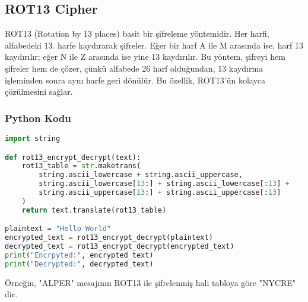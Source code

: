 \subsection{ROT13 Cipher}

ROT13 (Rotation by 13 places) basit bir şifreleme yöntemidir. Her harfi, alfabedeki 13. harfe kaydırarak şifreler. Eğer bir harf A ile M arasında ise, harf 13 kaydırılır; eğer N ile Z arasında ise yine 13 kaydırılır. Bu yöntem, şifreyi hem şifreler hem de çözer, çünkü alfabede 26 harf olduğundan, 13 kaydırma işleminden sonra aynı harfe geri dönülür. Bu özellik, ROT13'ün kolayca çözülmesini sağlar.

\subsubsection{Python Kodu}

\begin{lstlisting}[language=Python]
import string

def rot13_encrypt_decrypt(text):
    rot13_table = str.maketrans(
        string.ascii_lowercase + string.ascii_uppercase,
        string.ascii_lowercase[13:] + string.ascii_lowercase[:13] +
        string.ascii_uppercase[13:] + string.ascii_uppercase[:13]
    )
    return text.translate(rot13_table)

plaintext = "Hello World"
encrypted_text = rot13_encrypt_decrypt(plaintext)
decrypted_text = rot13_encrypt_decrypt(encrypted_text)
print("Encrpyted:", encrypted_text)
print("Decrypted:", decrypted_text)
\end{lstlisting}

\begin{table}[ht]
\centering
{}
\end{table}

Örneğin, "ALPER" mesajının ROT13 ile şifrelenmiş hali tabloya göre "NYCRE" dir.

\newpage

